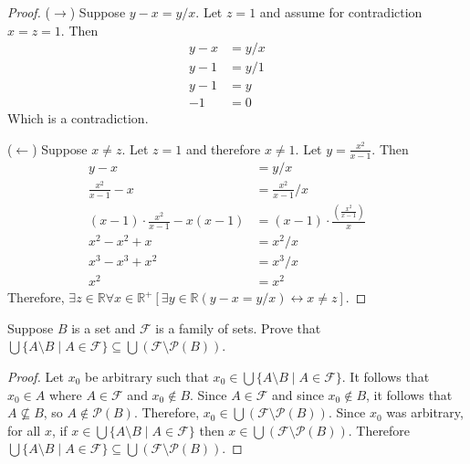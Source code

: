 \begin{proof}
    ($\rightarrow$) Suppose $y - x = y / x$. Let $z = 1$ and assume for contradiction $x = z = 1$.
    Then
    \begin{align*}
        y - x & = y / x &  & \\
        y - 1 & = y / 1 &  & \\
        y - 1 & = y     &  & \\
        -1    & = 0
    \end{align*}
    Which is a contradiction.

    ($\leftarrow$) Suppose $x \not = z$. Let $z = 1$ and therefore $x \not = 1$.
    Let $y = \frac{x^2}{x - 1}$. Then 
    \begin{align*}
        y - x                                      & = y / x                                       &  & \\
        \frac{x^2}{x - 1} - x                      & = \frac{x^2}{x - 1} / x                       &  & \\
        (x - 1) \cdot \frac{x^2}{x - 1} - x(x - 1) & = (x - 1) \cdot \frac{(\frac{x^2}{x - 1})}{x} &  & \\
        x^2 - x^2 + x                              & = x^2 / x                                     &  & \\
        x^3 - x^3 + x^2                            & = x^3 / x                                     &  & \\
        x^2                                        & = x^2
    \end{align*}
    Therefore, $\exists{z} \in \mathbb{R} \forall{x} \in \mathbb{R^{+}}
        [\exists{y} \in \mathbb{R}(y - x = y / x) \leftrightarrow x \not = z]$.
\end{proof}

\begin{tcolorbox}[title=Problem 15, breakable]
    Suppose $B$ is a set and $\mathcal{F}$ is a family of sets.
    Prove that $\bigcup\{A \setminus B \mid A \in \mathcal{F}\}
        \subseteq \bigcup (\mathcal{F} \setminus \mathcal{P}(B))$.
\end{tcolorbox}

\begin{proof}
    Let \(x_0\) be arbitrary such that \(x_0 \in \bigcup \{A \setminus B \mid A \in \mathcal{F}\}\).  
    It follows that \(x_0 \in A\) where \(A \in \mathcal{F}\) and \(x_0 \notin B\).  
    Since \(A \in \mathcal{F}\) and since \(x_0 \notin B\), 
    it follows that  \(A \not\subseteq B\), so \(A \notin \mathcal{P}(B)\).  
    Therefore, \(x_0 \in \bigcup (\mathcal{F} \setminus \mathcal{P}(B))\).
    Since $x_0$ was arbitrary, for all $x$, if \(x \in \bigcup\{A \setminus B \mid A \in \mathcal{F}\}\) then
    \(x \in \bigcup (\mathcal{F} \setminus \mathcal{P}(B))\). Therefore 
    \(\bigcup\{A \setminus B \mid A \in \mathcal{F}\} 
    \subseteq \bigcup (\mathcal{F} \setminus \mathcal{P}(B))\).
\end{proof}

